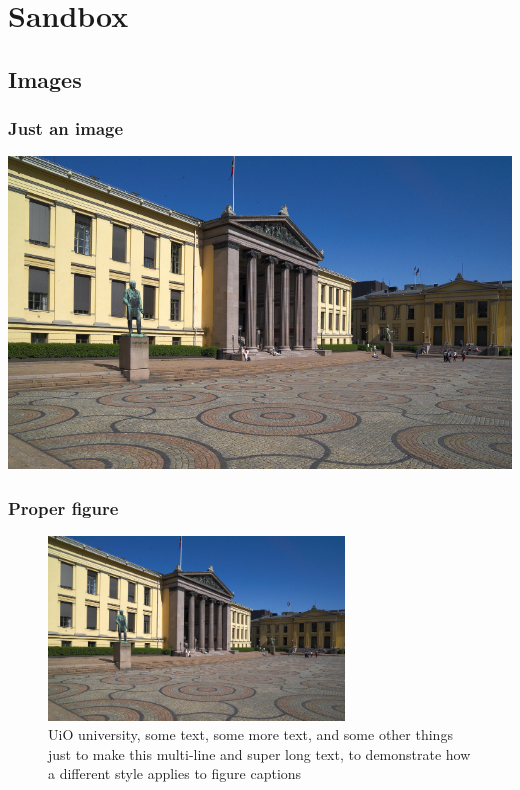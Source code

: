 \section{Sandbox}

\subsection{Images}

\subsubsection{Just an image}

\begin{center}
    \includegraphics[width=0.7\columnwidth]{./img/university-square-uio.jpg}
\end{center}

\subsubsection{Proper figure}

\begin{figure}[ht]
    \centering
    \includegraphics[width=0.7\textwidth]{./img/university-square-uio.jpg}
    \caption{UiO university, some text, some more text, and some other things just to make this multi-line and super long text, to demonstrate how a different style applies to figure captions}
    \label{fig:uio-university}
\end{figure}

